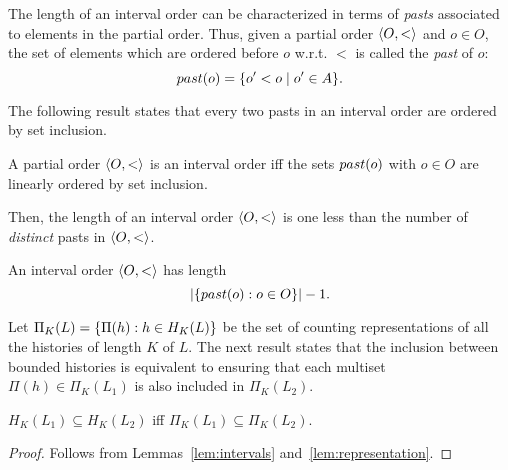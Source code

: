 The length of an interval order can be characterized in terms of \emph{pasts}
associated to elements in the partial order. Thus, given a partial order
$\left\langle {O,<} \right\rangle$ and $o\in O$, the set of elements which are ordered before $o$
w.r.t. $<$ is called the \emph{past} of $o$:
\[
\past{o}=\{o' < o\mid o'\in A\}.%
\]


The following result states that every two pasts in an interval order are
ordered by set inclusion.

\begin{lemma}

  A partial order $\left\langle {O,<} \right\rangle$ is an interval order iff the sets $past({o})$ with
  $o\in O$ are linearly ordered by set inclusion.

\end{lemma}

Then, the length of an interval order $\left\langle {O,<} \right\rangle$ is one less than the number
of \emph{distinct} pasts in $\left\langle {O,<} \right\rangle$.


\begin{lemma}
  \label{lemma:len}
  An interval order $\left\langle {O,<} \right\rangle$ has length
  \[ |{\{ past({o}):o\in O \}}| - 1 \text{.} \]
\end{lemma}

Let $\Pi_K(L)={\{ \Pi(h):h\in H_K(L) \}}$ be the set of counting representations of all the histories of length $K$ of $L$.
The next result states that the inclusion between bounded histories is equivalent to ensuring that each multiset 
$\Pi(h) \in \Pi_K(L_1)$ is also included in $\Pi_K(L_2)$.

\begin{lemma}

  $H_K(L_1) \subseteq H_K(L_2)$ iff $\Pi_K(L_1) \subseteq \Pi_K(L_2)$.

\end{lemma}

\begin{proof}

  Follows from Lemmas~\ref{lem:intervals} and~\ref{lem:representation}.

\end{proof}

